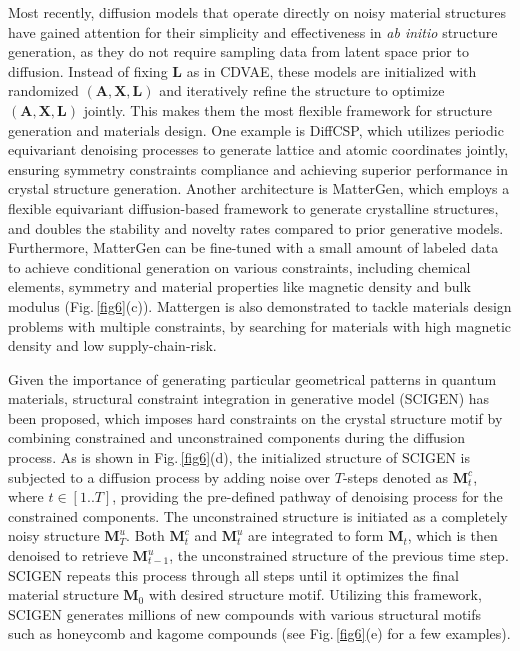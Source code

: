 \documentclass[fleqn,10pt]{wlscirep}
\begin{document}
Most recently, diffusion models that operate directly on noisy material structures have gained attention for their simplicity and effectiveness in \textit{ab initio} structure generation, as they do not require sampling data from latent space prior to diffusion. 
Instead of fixing $\textbf{L}$ as in CDVAE, these models are initialized with randomized $(\textbf{A}, \textbf{X}, \textbf{L})$ and iteratively refine the structure to optimize $(\textbf{A}, \textbf{X}, \textbf{L})$ jointly. This makes them the most flexible framework for structure generation and materials design.
One example is DiffCSP, which utilizes periodic equivariant denoising processes to generate lattice and atomic coordinates jointly, ensuring symmetry constraints compliance and achieving superior performance in crystal structure generation\cite{jiao2023crystal}. 
Another architecture is MatterGen, which employs a flexible equivariant diffusion-based framework to generate crystalline structures, and doubles the stability and novelty rates compared to prior generative models. 
Furthermore, MatterGen can be fine-tuned with a small amount of labeled data to achieve conditional generation on various constraints, including chemical elements, symmetry and material properties like magnetic density and bulk modulus\cite{zeni2025generative} (Fig.\,\ref{fig6}(c)). Mattergen is also demonstrated to tackle materials design problems with multiple constraints, by searching for materials with high magnetic density and low supply-chain-risk.

Given the importance of generating particular geometrical patterns in quantum materials, structural constraint integration in generative model (SCIGEN) has been proposed, which imposes hard constraints on the crystal structure motif by combining constrained and unconstrained components during the diffusion process\cite{okabe2024structural}. 
As is shown in Fig.\,\ref{fig6}(d), the initialized structure of SCIGEN is subjected to a diffusion process by adding noise over $T$-steps denoted as $\boldsymbol{M}_{t}^c$, where $t \in [1..T]$, providing the pre-defined pathway of denoising process for the constrained components. 
The unconstrained structure is initiated as a completely noisy structure $\boldsymbol{M}_{T}^u$. Both $\boldsymbol{M}_{t}^c$ and $\boldsymbol{M}_{t}^u$ are integrated to form $\boldsymbol{M}_{t}$, which is then denoised to retrieve $\boldsymbol{M}_{t-1}^u$, the unconstrained structure of the previous time step. 
SCIGEN repeats this process through all steps until it optimizes the final material structure $\boldsymbol{M}_{0}$ with desired structure motif.
Utilizing this framework, SCIGEN generates millions of new compounds with various structural motifs such as honeycomb and kagome compounds (see Fig.\,\ref{fig6}(e) for a few examples).
\end{document}
